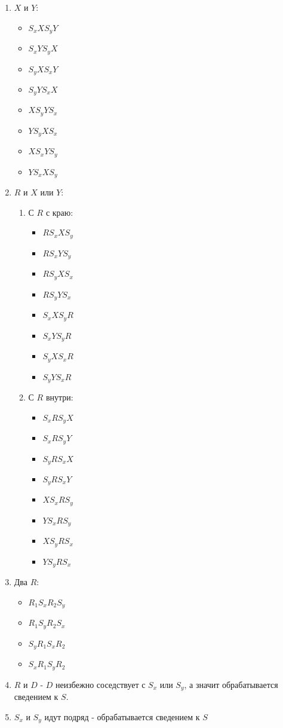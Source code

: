 \begin{enumerate}
	\item $X$ и $Y$:
	\begin{itemize}
		\item $S_x X S_y Y$
		\item $S_x Y S_y X$
		\item $S_y X S_x Y$
		\item $S_y Y S_x X$
		\item $X S_y Y S_x$ 
		\item $Y S_y X S_x$ 
		\item $X S_x Y S_y$ 
		\item $Y S_x X S_y$
	\end{itemize}
	\item $R$ и $X$ или $Y$:
	\begin{enumerate}
		\item С $R$ с краю:
		\begin{itemize}
			\item $R S_x X S_y$
			\item $R S_x Y S_y$
			\item $R S_y X S_x$
			\item $R S_y Y S_x$
			\item $S_x X S_y R$ 
			\item $S_x Y S_y R$ 
			\item $S_y X S_x R$ 
			\item $S_y Y S_x R$
		\end{itemize}
		\item С $R$ внутри:
		\begin{itemize}
			\item $S_x R S_y X$
			\item $S_x R S_y Y$
			\item $S_y R S_x X$
			\item $S_y R S_x Y$
			\item $X S_x R S_y$
			\item $Y S_x R S_y$
			\item $X S_y R S_x$
			\item $Y S_y R S_x$
		\end{itemize}
	\end{enumerate}
	\item Два $R$:
	\begin{itemize}
			\item $R_1 S_x R_2 S_y$
			\item $R_1 S_y R_2 S_x$
			\item $S_y R_1 S_x R_2$
			\item $S_x R_1 S_y R_2$
	\end{itemize}
	\item $R$ и $D$ - $D$ неизбежно соседствует с $S_x$ или $S_y$, а значит обрабатывается сведением к $S$.
	\item $S_x$ и $S_y$ идут подряд - обрабатывается сведением к $S$
\end{enumerate}
